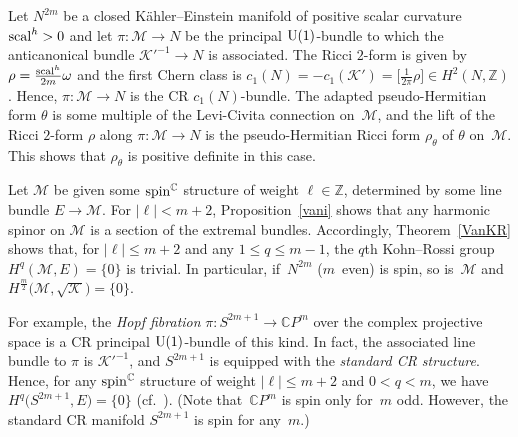 \documentclass[10pt,a4paper]{amsart}
\numberwithin{equation}{section}
\newcommand{\ZZ}{\mathbb{Z}}
\newcommand{\CC}{\mathbb{C}}
\begin{document}
\begin{Example}
Let $N^{2m}$ be a closed K\"ahler--Einstein manifold of positive scalar curvature ${\rm scal}^h>0$ and let
$\pi\colon \mathcal{M}\to N$ be the principal ${\rm U}(1)$-bundle to which the anticanonical bundle $\mathcal{K}'^{-1}\to N$ is associated.
The Ricci $2$-form is given by $\rho=\frac{{\rm scal}^h}{2m}\omega$ and the first Chern class is
$c_1(N)=-c_1(\mathcal{K}')=\big[\frac{1}{2\pi}\rho\big]\in H^2(N,\ZZ)$. Hence, $\pi\colon \mathcal{M}\to N$ is the
CR $c_1(N)$-bundle. The adapted pseudo-Hermitian form $\theta$ is some multiple of the Levi-Civita connection on~$\mathcal{M}$, and
the lift of the Ricci $2$-form $\rho$ along $\pi\colon \mathcal{M}\to N$ is the pseudo-Hermitian Ricci form $\rho_\theta$ of $\theta$ on~$\mathcal{M}$. This shows that $\rho_\theta$ is positive definite in this case.

Let $\mathcal{M}$ be given some ${\rm spin}^\CC$ structure of weight $\ell\in\ZZ$, determined by some line bundle $E\to \mathcal{M}$.
For $|\ell|<m+2$, Proposition~\ref{vani} shows that any harmonic spinor on $\mathcal{M}$ is a section of the extremal bundles.
Accordingly, Theorem~\ref{VanKR} shows that, for $|\ell|\leq m+2$ and any $1\leq q\leq m-1$, the $q$th Kohn--Rossi group
$H^q(\mathcal{M},E)=\{0\}$ is trivial. In particular, if~$N^{2m}$ ($m$~even) is spin, so is~$\mathcal{M}$ and
$H^{\frac{m}{2}}\big(\mathcal{M},\sqrt{\mathcal{K}}\big)=\{0\}$.

For example, the {\em Hopf fibration} $\pi\colon S^{2m+1}\to \CC P^{m}$ over the complex projective space is a CR principal ${\rm U}(1)$-bundle of this
kind. In fact, the associated line bundle to $\pi$ is $\mathcal{K}'^{-1}$, and $S^{2m+1}$ is equipped with the {\em standard CR structure}.
Hence, for any ${\rm spin}^\CC$ structure of weight $|\ell|\leq
m+2$ and $0<q<m$,
we have $H^q\big(S^{2m+1},E\big)=\{0\}$ (cf.~\cite{Tan}). (Note that~$\CC P^{m}$ is spin only for~$m$ odd. However, the standard CR manifold $S^{2m+1}$ is spin for any~$m$.)
\end{Example}
\end{document}
